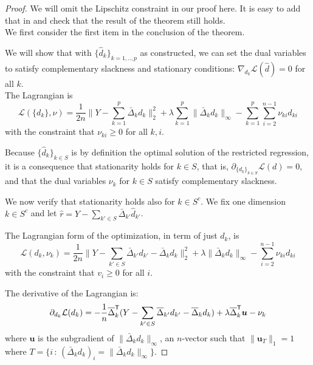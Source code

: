 \begin{proof} 
We will omit the Lipschitz constraint in our proof here. It is easy to add that in and check that the result of the theorem still holds.\\

We first consider the first item in the conclusion of the theorem.

We will show that with $\{\hat{d}_k\}_{k=1,..,p}$ as constructed, we can set the dual variables to satisfy complementary slackness and stationary conditions: $\nabla_{d_k} \mathcal{L}(\hat{d})  = 0$ for all $k$.\\ 

The Lagrangian is
\begin{equation}
\label{eqn:full_lagrange}
\mathcal{L}( \{ d_k \}, \nu) = 
  \frac{1}{2n} \Big\| 
    Y - \sum_{k=1}^p  \bar{\Delta}_k d_k  \Big\|_2^2 + 
    \lambda \sum_{k=1}^p \| \bar{\Delta}_k d_k \|_\infty -
    \sum_{k=1}^p \sum_{i=2}^{n-1} \nu_{ki} d_{ki} 
\end{equation}
with the constraint that $\nu_{ki} \geq 0$ for all $k,i$.

Because $\{\hat{d}_k\}_{k \in S}$ is by definition the optimal solution of the restricted regression, it is a consequence that stationarity holds for $k \in S$, that is, $\partial_{ \{ d_k \}_{k \in S} } \mathcal{L}(d) = 0$, and that the dual variables $\nu_k$ for $k \in S$ satisfy complementary slackness.

We now verify that stationarity holds also for $k \in S^c$. We fix one dimension $k \in S^c$ and let $\hat{r} = Y - \sum_{k' \in S} \bar{\Delta}_{k'} \hat{d}_{k'}$. 

The Lagrangian form of the optimization, in term of just $d_k$, is
\[
\mathcal{L}(d_k, \nu_k) =
  \frac{1}{2n} \big\| Y - \sum_{k' \in S} \bar{\Delta}_{k'} d_{k'} 
  -  \bar{\Delta}_k d_k \big\|_2^2 
   + \lambda \| \bar{\Delta}_k d_k\|_\infty
  - \sum_{i=2}^{n-1} \nu_{ki} d_{ki}
\]
with the constraint that $v_i \geq 0$ for all $i$. 

The derivative of the Lagrangian is:
\begin{align*}
\partial_{d_k} \mathcal{L}(d_k) =  -\frac{1}{n} \overline{\Delta}_k^{\mathsf{T}} ( Y - \sum_{k'\in S} \overline{\Delta}_{k'} d_{k'}  - \overline{\Delta}_k d_k )
        + \lambda \overline{\Delta}_k^{\mathsf{T}} \mbox{\boldmath $u$}
      - \nu_k
\end{align*}
where $\mathbf{u}$ is the subgradient of $\| \bar{\Delta}_k d_k \|_\infty$, an $n$-vector such that $\| \mathbf{u}_T \|_1 = 1$ where $T = \{ i \,:\,  (\bar{\Delta}_k d_k)_i = \| \bar{\Delta}_k d_k \|_\infty \}$.


\end{proof}
